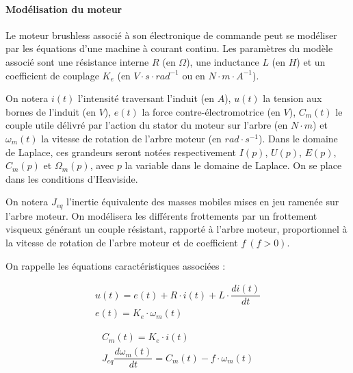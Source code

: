 \paragraph{Modélisation du moteur}

Le moteur brushless associé à son électronique de commande peut se modéliser par les équations d'une machine à courant continu. Les paramètres du modèle associé sont une résistance interne $R$ (en $\Omega$), une inductance $L$ (en $H$) et un coefficient de couplage $K_e$ (en $V\cdot s\cdot rad^{-1}$ ou en $N\cdot m\cdot A^{-1}$).

On notera $i(t)$ l'intensité traversant l'induit (en $A$), $u(t)$ la tension aux bornes de l'induit (en $V$), $e(t)$ la force contre-électromotrice (en $V$), $C_m(t)$ le couple utile délivré par l'action du stator du moteur sur l'arbre (en $N\cdot m$) et $\omega_m(t)$ la vitesse de rotation de l'arbre moteur (en $rad\cdot s^{-1}$). Dans le domaine de Laplace, ces grandeurs seront notées respectivement $I(p)$, $U(p)$, $E(p)$, $C_m(p)$ et $\Omega_m(p)$, avec $p$ la variable dans le domaine de Laplace. On se place dans les conditions d'Heaviside.

On notera $J_{eq}$ l'inertie équivalente des masses mobiles mises en jeu ramenée sur l'arbre moteur. On
modélisera les différents frottements par un frottement visqueux générant un couple résistant, rapporté
à l'arbre moteur, proportionnel à la vitesse de rotation de l'arbre moteur et de coefficient $f\ (f>0)$.

On rappelle les équations caractéristiques associées :\\
\begin{minipage}{.45\linewidth}
\begin{eqnarray}
u(t)=e(t)+R\cdot i(t)+L\cdot \dfrac{di(t)}{dt}\\
e(t)=K_e\cdot\omega_m(t)
\end{eqnarray}
\end{minipage}\hfill
\begin{minipage}{.45\linewidth}
\begin{eqnarray}
C_m(t)=K_e\cdot i(t)\\
J_{eq}\dfrac{d\omega_m(t)}{dt}=C_m(t)-f\cdot \omega_m(t)
\end{eqnarray}
\end{minipage}



